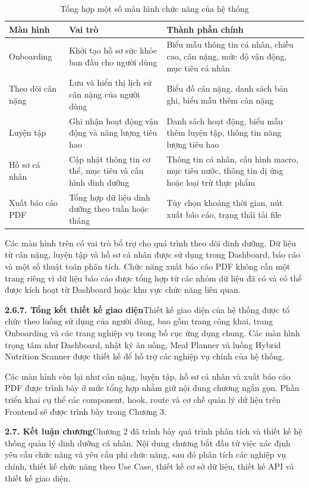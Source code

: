 \begin{table}[H]
\centering
\caption{Tổng hợp một số màn hình chức năng của hệ thống}
\begin{tabular}{|p{4cm}|p{5.5cm}|p{5.5cm}|}
\hline
\textbf{Màn hình} & \textbf{Vai trò} & \textbf{Thành phần chính} \\ \hline
Onboarding & Khởi tạo hồ sơ sức khỏe ban đầu cho người dùng & Biểu mẫu thông tin cá nhân, chiều cao, cân nặng, mức độ vận động, mục tiêu cá nhân \\ \hline
Theo dõi cân nặng & Lưu và hiển thị lịch sử cân nặng của người dùng & Biểu đồ cân nặng, danh sách bản ghi, biểu mẫu thêm cân nặng \\ \hline
Luyện tập & Ghi nhận hoạt động vận động và năng lượng tiêu hao & Danh sách hoạt động, biểu mẫu thêm luyện tập, thông tin năng lượng tiêu hao \\ \hline
Hồ sơ cá nhân & Cập nhật thông tin cơ thể, mục tiêu và cấu hình dinh dưỡng & Thông tin cá nhân, cấu hình macro, mục tiêu nước, thông tin dị ứng hoặc loại trừ thực phẩm \\ \hline
Xuất báo cáo PDF & Tổng hợp dữ liệu dinh dưỡng theo tuần hoặc tháng & Tùy chọn khoảng thời gian, nút xuất báo cáo, trạng thái tải file \\ \hline
\end{tabular}
\end{table}

Các màn hình trên có vai trò bổ trợ cho quá trình theo dõi dinh dưỡng. Dữ liệu từ cân nặng, luyện tập và hồ sơ cá nhân được sử dụng trong Dashboard, báo cáo và một số thuật toán phân tích. Chức năng xuất báo cáo PDF không cần một trang riêng vì dữ liệu báo cáo được tổng hợp từ các nhóm dữ liệu đã có và có thể được kích hoạt từ Dashboard hoặc khu vực chức năng liên quan.

\textbf{2.6.7. Tổng kết thiết kế giao diện}Thiết kế giao diện của hệ thống được tổ chức theo luồng sử dụng của người dùng, bao gồm trang công khai, trang Onboarding và các trang nghiệp vụ trong bố cục ứng dụng chung. Các màn hình trọng tâm như Dashboard, nhật ký ăn uống, Meal Planner và luồng Hybrid Nutrition Scanner được thiết kế để hỗ trợ các nghiệp vụ chính của hệ thống.

Các màn hình còn lại như cân nặng, luyện tập, hồ sơ cá nhân và xuất báo cáo PDF được trình bày ở mức tổng hợp nhằm giữ nội dung chương ngắn gọn. Phần triển khai cụ thể các component, hook, route và cơ chế quản lý dữ liệu trên Frontend sẽ được trình bày trong Chương 3.

\textbf{2.7. Kết luận chương}Chương 2 đã trình bày quá trình phân tích và thiết kế hệ thống quản lý dinh dưỡng cá nhân. Nội dung chương bắt đầu từ việc xác định yêu cầu chức năng và yêu cầu phi chức năng, sau đó phân tích các nghiệp vụ chính, thiết kế chức năng theo Use Case, thiết kế cơ sở dữ liệu, thiết kế API và thiết kế giao diện.

